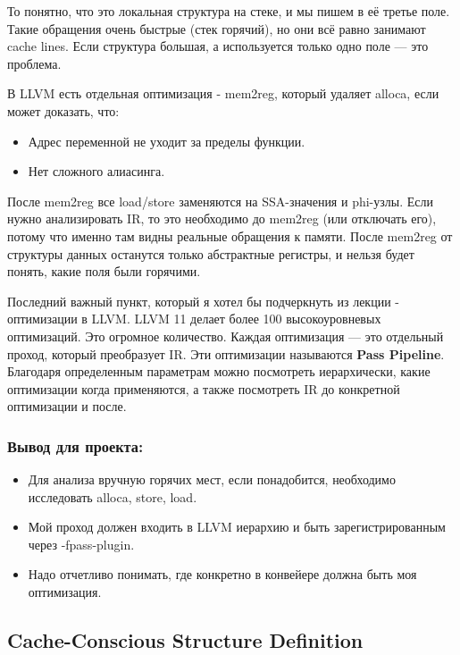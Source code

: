 \documentclass[a4paper,12pt]{article}
\begin{document}
То понятно, что это локальная структура на стеке, и мы пишем в её третье поле. Такие
обращения очень быстрые (стек горячий), но они всё равно занимают cache lines.
Если структура большая, а используется только одно поле — это проблема.

В LLVM есть отдельная оптимизация - mem2reg, который удаляет alloca, если может доказать,
что:

\begin{itemize}
    \item Адрес переменной не уходит за пределы функции.
    \item Нет сложного алиасинга.
\end{itemize}

После mem2reg все load/store заменяются на SSA-значения и phi-узлы. Если нужно анализировать
IR, то это необходимо до mem2reg (или отключать его), потому что именно там видны реальные обращения к памяти. После mem2reg от структуры данных останутся только абстрактные регистры,
и нельзя будет понять, какие поля были горячими.

Последний важный пункт, который я хотел бы подчеркнуть из лекции - оптимизации в
LLVM. LLVM 11 делает более 100 высокоуровневых оптимизаций. Это огромное
количество. Каждая оптимизация — это отдельный проход, который преобразует IR.
Эти оптимизации называются \textbf{Pass Pipeline}. Благодаря определенным
параметрам можно посмотреть иерархически, какие оптимизации когда применяются, а
также посмотреть IR до конкретной оптимизации и после.

\subsubsection{Вывод для проекта:}

\begin{itemize}
    \item Для анализа вручную горячих мест, если понадобится, необходимо исследовать 
        alloca, store, load. 
    \item Мой проход должен входить в LLVM иерархию и быть зарегистрированным через 
        -fpass-plugin.
    \item Надо отчетливо понимать, где конкретно в конвейере должна быть моя
        оптимизация.
\end{itemize}

\subsection{Cache-Conscious Structure Definition}
\end{document}
